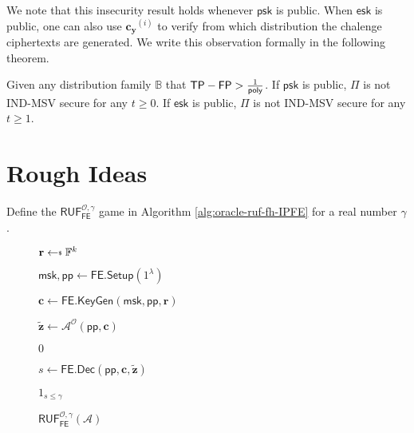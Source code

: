 We note that this insecurity result holds whenever $\textsf{psk}$ is public. When $\textsf{esk}$ is public, one can also use $\mathbf{c_y}^{(i)}$ to verify from which distribution the chalenge ciphertexts are generated. We write this observation formally in the following theorem.

\begin{theorem}

Given any distribution family $\mathbb{B}$ that $\textsf{TP} - \textsf{FP} > \frac{1}{\mathsf{poly}}$. If $\textsf{psk}$ is public, $\Pi$ is not IND-MSV secure for any $t \geq 0$. If $\textsf{esk}$ is public, $\Pi$ is not IND-MSV secure for any $t \geq 1$.

\end{theorem}




\newpage

\section{Rough Ideas}

Define the $\textsf{RUF}^{\mathcal{O}, \gamma}_\textsf{FE}$ game in Algorithm \ref{alg:oracle-ruf-fh-IPFE} for a real number $\gamma$.

\begin{figure}[h]
\centering

	\begin{minipage}[t]{0.55\textwidth}
	\begin{algorithm}[H]
	\caption{$\textsf{RUF}^{\mathcal{O}, \gamma}_{\textsf{FE}}(\mathcal{A})$}
	\label{alg:oracle-ruf-fh-IPFE}
	\begin{algorithmic}[1]
		\State $\mathbf{r} \getsdollar \mathbb{F}^{k}$ \label{alg:oracle-ruf-fh-IPFE:r}

		\State $\textsf{msk}, \textsf{pp} \gets \textsf{FE.Setup}(1^\lambda)$

		\State $\mathbf{c} \gets \textsf{FE.KeyGen}(\textsf{msk}, \textsf{pp}, \mathbf{r})$

		\State $\mathbf{\tilde{z}} \gets \mathcal{A}^{\mathcal{O}} ( \textsf{pp}, \mathbf{c} )$

			
			\State \Return $0$
		
		\EndIf

		\State $s \gets \textsf{FE.Dec}(\textsf{pp}, \mathbf{c}, \mathbf{\tilde{z}} )$

		\State \Return $1_{s \leq \gamma}$
	\end{algorithmic}
	\end{algorithm}
	\end{minipage}

\end{figure}

